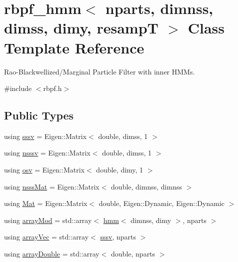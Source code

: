 \hypertarget{classrbpf__hmm}{}\section{rbpf\+\_\+hmm$<$ nparts, dimnss, dimss, dimy, resampT $>$ Class Template Reference}
\label{classrbpf__hmm}


Rao-\/\+Blackwellized/\+Marginal Particle Filter with inner H\+M\+Ms.  




{\ttfamily \#include $<$rbpf.\+h$>$}

\subsection*{Public Types}
\begin{DoxyCompactItemize}
\item 
using \hyperlink{classrbpf__hmm_aa7d73e78fca38e3652890c5c3680dee9}{sssv} = Eigen\+::\+Matrix$<$ double, dimss, 1 $>$
\item 
using \hyperlink{classrbpf__hmm_a87376e321cce5bd3211825c509d17440}{nsssv} = Eigen\+::\+Matrix$<$ double, dimss, 1 $>$
\item 
using \hyperlink{classrbpf__hmm_a6ce5868477ec9ad6eaa3b3b23e99e1ae}{osv} = Eigen\+::\+Matrix$<$ double, dimy, 1 $>$
\item 
using \hyperlink{classrbpf__hmm_a24eee6edeb28e16e01b69c2f7eab4e06}{nsss\+Mat} = Eigen\+::\+Matrix$<$ double, dimnss, dimnss $>$
\item 
using \hyperlink{classrbpf__hmm_a5977cfebfd8736d3a54390f5a21d40b2}{Mat} = Eigen\+::\+Matrix$<$ double, Eigen\+::\+Dynamic, Eigen\+::\+Dynamic $>$
\item 
using \hyperlink{classrbpf__hmm_a7a98fa51630fb04d09c3bd73e3e82ba8}{array\+Mod} = std\+::array$<$ \hyperlink{classhmm}{hmm}$<$ dimnss, dimy $>$, nparts $>$
\item 
using \hyperlink{classrbpf__hmm_a9d9a1df8406fa41b2422291768d9c2f4}{array\+Vec} = std\+::array$<$ \hyperlink{classrbpf__hmm_aa7d73e78fca38e3652890c5c3680dee9}{sssv}, nparts $>$
\item 
using \hyperlink{classrbpf__hmm_a678ef06587101ea51bbb5709f08644bd}{array\+Double} = std\+::array$<$ double, nparts $>$
\end{DoxyCompactItemize}
